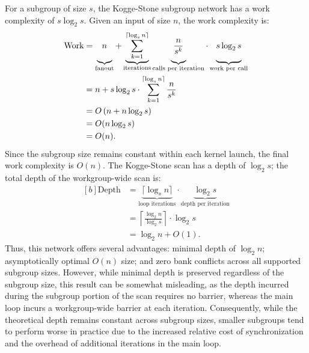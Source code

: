 \documentclass[acmsmall, manuscript, screen, review, anonymous]{acmart}
\begin{document}
For a subgroup of size $s$, the Kogge-Stone subgroup network has a work complexity of $s \log_2 s$. Given an input of size $n$, the work complexity is:
\begin{equation}
  \begin{aligned}[b]
    \text{Work} & = \underbrace{\vphantom{\sum_{k=0}^{\lceil \log_s n \rceil}}n}_{\text{fanout}}
    +
    \underbrace{\sum_{k=1}^{\lceil \log_s n \rceil}}_{\text{iterations}}
    \underbrace{\vphantom{\sum_{k=1}^{\lceil \log_s n \rceil}}\frac{n}{s^k}}_{\text{calls per iteration}}
    \cdot
    \underbrace{\vphantom{\sum_{k=1}^{\lceil \log_s n \rceil}}s \log_2 s}_{\text{work per call}} \\
                & = n + s \log_2 s \cdot \sum_{k=1}^{\lceil \log_s n \rceil} \frac{n}{s^k}       \\
                & = O\left(n + n \log_2 s\right)                                                 \\
                & = O(n \log_2 s)                                                                \\
                & = O(n).
  \end{aligned}
\end{equation}
Since the subgroup size remains constant within each kernel launch, the final work complexity is $O(n)$. The Kogge-Stone scan has a depth of $\log_2 s$; the total depth of the workgroup-wide scan is:
\begin{equation}
  \begin{aligned}[b]
    \text{Depth} & = \underbrace{\lceil \log_s n \rceil}_{\text{loop iterations}}
    \cdot \underbrace{\log_2 s}_{\text{depth per iteration}}                           \\
                 & = \left\lceil \frac{\log_2 n}{\log_2 s} \right\rceil \cdot \log_2 s \\
                 & = \log_2 n + O(1).
  \end{aligned}
\end{equation}
Thus, this network offers several advantages: minimal depth of $\log_2 n$; asymptotically optimal $O(n)$ size; and zero bank conflicts across all supported subgroup sizes. However, while minimal depth is preserved regardless of the subgroup size, this result can be somewhat misleading, as the depth incurred during the subgroup portion of the scan requires no barrier, whereas the main loop incurs a workgroup-wide barrier at each iteration. Consequently, while the theoretical depth remains constant across subgroup sizes, smaller subgroups tend to perform worse in practice due to the increased relative cost of synchronization and the overhead of additional iterations in the main loop.
\end{document}
